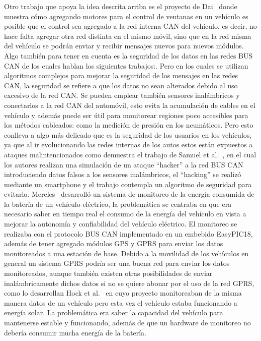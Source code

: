 Otro trabajo que apoya la idea descrita arriba es el proyecto de Dai~\cite{DOR} donde muestra cómo agregando motores para el control de ventanas en un vehículo es posible que el control sea agregado a la red interna CAN del vehículo, es decir, no hace falta agregar otra red distinta en el mismo móvil, sino que en la red misma del vehículo se podrán enviar y recibir mensajes nuevos para nuevos módulos. 
Algo también para tener en cuenta es la seguridad de los datos en las redes BUS CAN de los cuales hablan los siguientes trabajos:\cite{RS, EP, ADA, RPA}. 
Pero en los cuales se utilizan algoritmos complejos para mejorar la seguridad de los mensajes en las redes CAN, la seguridad se refiere a que los datos no sean alterados debido al uso excesivo de la red CAN. 
Se pueden emplear también sensores inalámbricos y conectarlos a la red CAN del automóvil, esto evita la acumulación de cables en el vehículo y además puede ser útil para monitorear regiones poco accesibles para los métodos cableados: como la medición de presión en los neumáticos. 
Pero esto conlleva a algo más delicado que es la seguridad de los usuarios en los vehículos, ya que al ir evolucionando las redes internas de los autos estos están expuestos a ataques malintencionados como demuestra el trabajo de Samuel et al.~\cite{ACAN},  en el cual los autores realizan una simulación de un ataque “hacker” a la red BUS CAN introduciendo datos falsos a los sensores inalámbricos, el “hacking” se realizó mediante un smartphone y el trabajo contempla un algoritmo de seguridad para evitarlo. 
Mereles~\cite{PSMR} desarrolló un sistema de monitoreo de la energía consumida de la batería de un vehículo eléctrico, la problemática se centraba en que era necesario saber en tiempo real el consumo de la energía del vehículo en vista a mejorar la autonomía y confiabilidad del vehículo eléctrico. 
El monitoreo se realizaba con el protocolo BUS CAN implementado en un embebido EasyPIC18, además de tener agregado módulos GPS y GPRS para enviar los datos monitoreados a una estación de base. 
Debido a la movilidad de los vehículos en general un sistema GPRS podría ser una buena red para enviar los datos monitoreados, aunque también existen otras posibilidades de enviar inalámbricamente dichos datos si no se quiere abonar por el uso de la red GPRS, como lo desarrollan Hock et al.~\cite{DWCAN} en cuyo proyecto monitoreaban de la misma manera datos de un vehículo pero esta vez el vehículo estaba funcionando a energía solar. 
La problemática era saber la capacidad del vehículo para mantenerse estable y funcionando, además de que un hardware de monitoreo no debería consumir mucha energía de la batería. 
